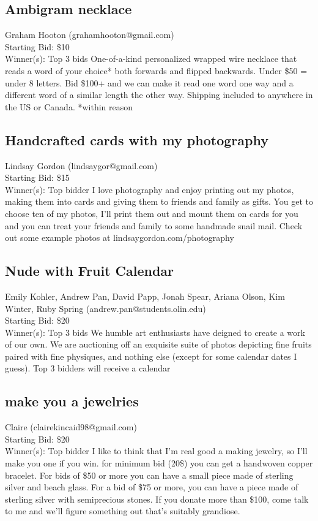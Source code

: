 \documentclass[11pt]{article}
\begin{document}
\subsection{Ambigram necklace}
Graham Hooton (grahamhooton@gmail.com) \\
Starting Bid: \$10 \\
Winner(s): 
Top 3 bids\newline
One-of-a-kind personalized wrapped wire necklace that reads a word of your choice* both forwards and flipped backwards. Under \$50 = under 8 letters. Bid \$100+ and we can make it read one word one way and a different word of a similar length the other way. Shipping included to anywhere in the US or Canada.
*within reason
\subsection{Handcrafted cards with my photography}
Lindsay Gordon (lindsaygor@gmail.com) \\
Starting Bid: \$15 \\
Winner(s): 
Top bidder\newline
I love photography and enjoy printing out my photos, making them into cards and giving them to friends and family as gifts. You get to choose ten of my photos, I'll print them out and mount them on cards for you and you can treat your friends and family to some handmade snail mail. Check out some example photos at lindsaygordon.com/photography
\subsection{Nude with Fruit Calendar}
Emily Kohler, Andrew Pan, David Papp, Jonah Spear, Ariana Olson, Kim Winter, Ruby Spring (andrew.pan@students.olin.edu) \\
Starting Bid: \$20 \\
Winner(s): 
Top 3 bids\newline
We humble art enthusiasts have deigned to create a work of our own.  We are auctioning off an exquisite suite of photos depicting fine fruits paired with fine physiques, and nothing else (except for some calendar dates I guess).  Top 3 bidders will receive a calendar
\subsection{make you a jewelries}
Claire (clairekincaid98@gmail.com) \\
Starting Bid: \$20 \\
Winner(s): 
Top bidder\newline
I like to think that I'm real good a making jewelry, so I'll make you one if you win.  for minimum bid (20\$) you can get a handwoven copper bracelet.  For bids of \$50 or more you can have a small piece made of sterling silver and beach glass.  For a bid of \$75 or more, you can have a piece made of sterling silver with semiprecious stones.  If you donate more than \$100, come talk to me and we'll figure something out that's suitably grandiose.
\end{document}
